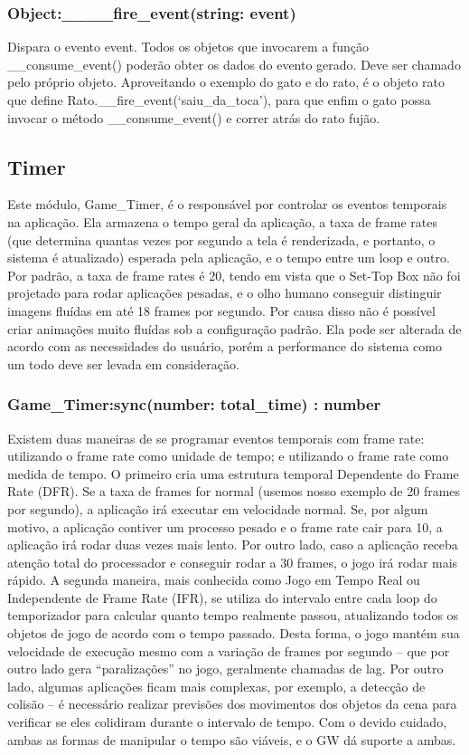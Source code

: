 \documentclass[
	12pt,				%
	openright,			%
	oneside,			%
	a4paper,			%
	brazil,				%
	]{abntex2}
\begin{document}
\subsubsection{Object:\_\_\_\_fire\_event(string: event)}

Dispara o evento event. Todos os objetos que invocarem a função \_\_consume\_event() poderão obter os dados do evento gerado. Deve ser chamado pelo próprio objeto. Aproveitando o exemplo do gato e do rato, é o objeto rato que define Rato.\_\_fire\_event(‘saiu\_da\_toca’), para que enfim o gato possa invocar o método \_\_consume\_event() e correr atrás do rato fujão.

\subsection{Timer}

Este módulo, Game\_Timer, é o responsável por controlar os eventos temporais na aplicação. Ela armazena o tempo geral da aplicação, a taxa de frame rates (que determina quantas vezes por segundo a tela é renderizada, e portanto, o sistema é atualizado) esperada pela aplicação, e o tempo entre um loop e outro. Por padrão, a taxa de frame rates é 20, tendo em vista que o Set-Top Box não foi projetado para rodar aplicações pesadas, e o olho humano conseguir distinguir imagens fluídas em até 18 frames por segundo. Por causa disso não é possível criar animações muito fluídas sob a configuração padrão. Ela pode ser alterada de acordo com as necessidades do usuário, porém a performance do sistema como um todo deve ser levada em consideração. 

\subsubsection{Game\_Timer:sync(number: total\_time) : number}

Existem duas maneiras de se programar eventos temporais com frame rate: utilizando o frame rate como unidade de tempo; e utilizando o frame rate como medida de tempo. O primeiro cria uma estrutura temporal Dependente do Frame Rate (DFR). Se a taxa de frames for normal (usemos nosso exemplo de 20 frames por segundo), a aplicação irá executar em velocidade normal. Se, por algum motivo, a aplicação contiver um processo pesado e o frame rate cair para 10, a aplicação irá rodar duas vezes mais lento. Por outro lado, caso a aplicação receba atenção total do processador e conseguir rodar a 30 frames, o jogo irá rodar mais rápido. A segunda maneira, mais conhecida como Jogo em Tempo Real ou Independente de Frame Rate (IFR), se utiliza do intervalo entre cada loop do temporizador para calcular quanto tempo realmente passou, atualizando todos os objetos de jogo de acordo com o tempo passado. Desta forma, o jogo mantém sua velocidade de execução mesmo com a variação de frames por segundo – que por outro lado gera “paralizações” no jogo, geralmente chamadas de lag. Por outro lado, algumas aplicações ficam mais complexas, por exemplo, a detecção de colisão – é necessário realizar previsões dos movimentos dos objetos da cena para verificar se eles colidiram durante o intervalo de tempo. Com o devido cuidado, ambas as formas de manipular o tempo são viáveis, e o GW dá suporte a ambas.
\end{document}
